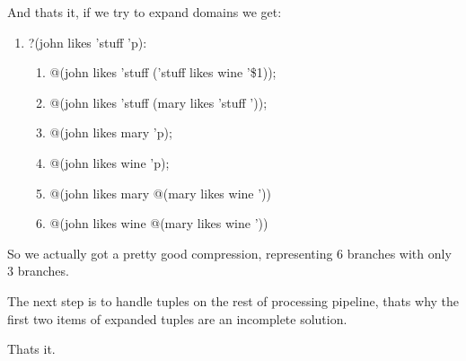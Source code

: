 \documentclass{article}
\begin{document}
And thats it, if we try to expand domains we get:

\begin{enumerate}
\item ?(john likes 'stuff 'p): 
      \begin{enumerate}
      \item @(john likes 'stuff ('stuff likes wine '\$1));
      \item @(john likes 'stuff (mary likes 'stuff '));
      \item @(john likes mary 'p);
      \item @(john likes wine 'p);
      \item @(john likes mary @(mary likes wine '))
      \item @(john likes wine @(mary likes wine '))
      \end{enumerate}
\end{enumerate}

So we actually got a pretty good compression, representing 6 branches with only 3 branches.

The next step is to handle tuples on the rest of processing pipeline, thats why the first two items 
of expanded tuples are an incomplete solution. 

Thats it.
\end{document}
